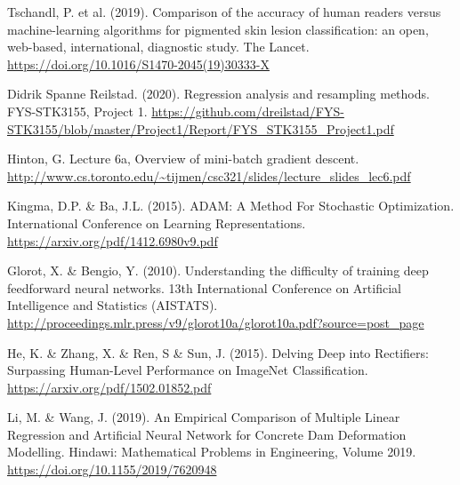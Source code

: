 \documentclass[a4paper,twocolumn]{article}
\begin{document}
\newpage
\begin{thebibliography}{9}
Tschandl, P. et al. (2019). Comparison of the accuracy of human readers versus machine-learning algorithms for pigmented skin lesion classification: an open, web-based, international, diagnostic study. The Lancet. \url{https://doi.org/10.1016/S1470-2045(19)30333-X}

Didrik Spanne Reilstad. (2020). Regression analysis and resampling methods. FYS-STK3155, Project 1. \url{https://github.com/dreilstad/FYS-STK3155/blob/master/Project1/Report/FYS_STK3155_Project1.pdf}

Hinton, G. Lecture 6a, Overview of mini-batch gradient descent. \url{http://www.cs.toronto.edu/~tijmen/csc321/slides/lecture_slides_lec6.pdf}

Kingma, D.P. \& Ba, J.L. (2015). ADAM: A Method For Stochastic Optimization. International Conference on Learning Representations. \url{https://arxiv.org/pdf/1412.6980v9.pdf}

Glorot, X. \& Bengio, Y. (2010). Understanding the difficulty of training deep feedforward neural networks. 13th International Conference on Artificial Intelligence and Statistics (AISTATS). \url{http://proceedings.mlr.press/v9/glorot10a/glorot10a.pdf?source=post_page}

He, K. \& Zhang, X. \& Ren, S \& Sun, J. (2015). Delving Deep into Rectifiers: Surpassing Human-Level Performance on ImageNet Classification. \url{https://arxiv.org/pdf/1502.01852.pdf}

Li, M. & Wang, J. (2019). An Empirical Comparison of Multiple Linear Regression and Artificial Neural Network for Concrete Dam Deformation Modelling. Hindawi: Mathematical Problems in Engineering, Volume 2019. \url{https://doi.org/10.1155/2019/7620948}
\end{thebibliography}
\end{document}
